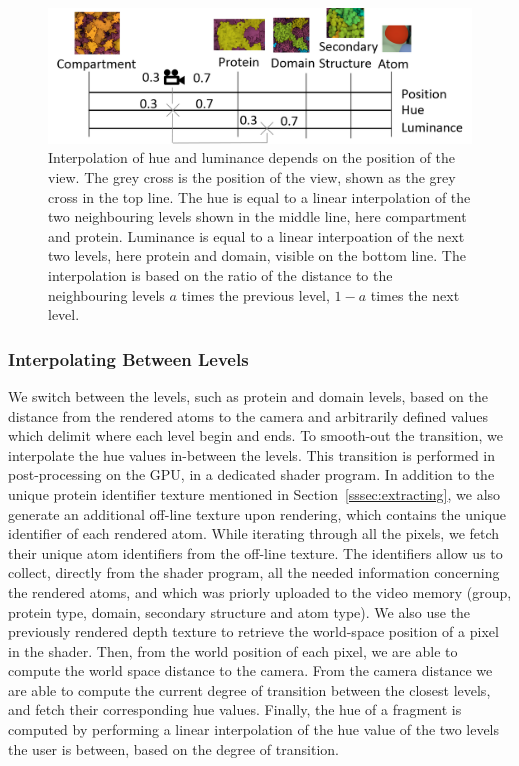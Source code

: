 \documentclass[review,journal]{vgtc}         %
\begin{document}
	\begin{figure}
		\centering
		\includegraphics[width=1\linewidth]{Figures/zoomfigure}
		\caption{Interpolation of hue and luminance depends on the position of the view. The grey cross is the position of the view, shown as the grey cross in the top line. The hue is equal to a linear interpolation of the two neighbouring levels shown in the middle line, here compartment and protein. Luminance is equal to a linear interpoation of the next two levels, here protein and domain, visible on the bottom line. The interpolation is based on the ratio of the distance to the neighbouring levels $a$ times the previous level, $1-a$ times the next level.  }
		\label{fig:zoom_continuum}
	\end{figure}
	
	\subsubsection{Interpolating Between Levels}
	
	We switch between the levels, such as protein and domain levels, based on the distance from the rendered atoms to the camera and arbitrarily defined values which delimit where each level begin and ends.
	To smooth-out the transition, we interpolate the hue values in-between the levels.	
	This transition is performed in post-processing on the GPU, in a dedicated shader program.
	In addition to the unique protein identifier texture mentioned in Section~\ref{sssec:extracting}, we also generate an additional off-line texture upon rendering, which contains the unique identifier of each rendered atom.
	While iterating through all the pixels, we fetch their unique atom identifiers from the off-line texture.
	The identifiers allow us to collect, directly from the shader program, all the needed information concerning the rendered atoms, and which was priorly uploaded to the video memory (group, protein type, domain, secondary structure and atom type).	
	We also use the previously rendered depth texture to retrieve the world-space position of a pixel in the shader.
	Then, from the world position of each pixel, we are able to compute the world space distance to the camera.
	From the camera distance we are able to compute the current degree of transition between the closest levels, and fetch their corresponding hue values.	
	Finally, the hue of a fragment is computed by performing a linear interpolation of the hue value of the two levels the user is between, based on the degree of transition.
	
\end{document}
